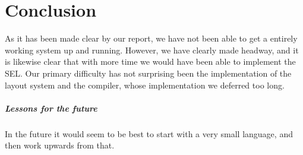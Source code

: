 \chapter*{Conclusion}

As it has been made clear by our report, we have not been able to get
a entirely working system up and running. However, we have clearly
made headway, and it is likewise clear that with more time we would
have been able to implement the SEL. Our primary difficulty has not
surprising been the implementation of the layout system and the
compiler, whose implementation we deferred too long. 

\paragraph{Lessons for the future}
In the future it would seem to be best to start with a very small
language, and then work upwards from that.


